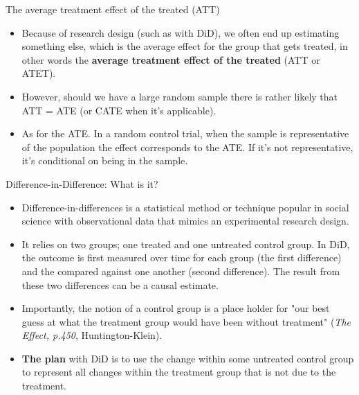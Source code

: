\documentclass[notes,11pt, aspectratio=169]{beamer}
\begin{document}
\begin{frame}{The average treatment effect of the treated (ATT)}
\begin{itemize}
      \item Because of research design (such as with DiD), we often end up estimating something else, which is the average effect for the group that gets treated, in other words the \textbf{average treatment effect of the treated} (ATT or ATET).

      \item However, should we have a large random sample there is rather likely that ATT = ATE (or CATE when it's applicable).

      \item As for the ATE. In a random control trial, when the sample is representative of the population the  effect corresponds to the ATE. If it's not representative, it's conditional on being in the sample.
\end{itemize}
\end{frame}

\begin{frame}{Difference-in-Difference: What is it?}
\begin{itemize}
        \item Difference-in-differences is a statistical method or technique popular in social science with observational data that mimics an experimental research design. 

        \item It relies on two groups; one treated and one untreated control group. In DiD, the outcome is first measured over time for each group (the first difference) and the compared against one another (second difference). The result from these two differences can be a causal estimate. 

        \item Importantly, the notion of a control group is a place holder for "our best guess at what the treatment group would have been without treatment" \tiny{ (\emph{The Effect, p.450}, Huntington-Klein)}.
\normalsize
        \item \textbf{The plan} with DiD is to use the change within some untreated control group to represent all changes within the treatment group that is not due to the treatment.
\end{itemize}
\normalsize
\end{frame}
\end{document}
